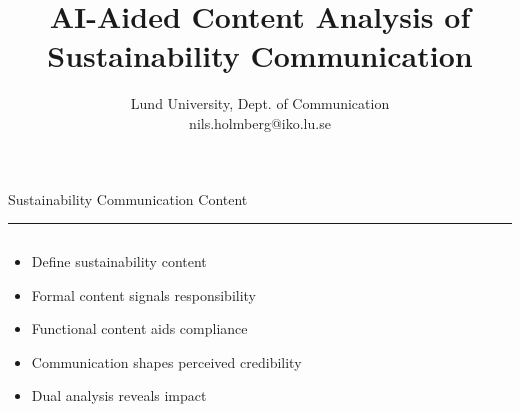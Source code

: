 \documentclass[aspectratio=169]{beamer}
\title{AI-Aided Content Analysis of Sustainability Communication}
\subtitle{Lund University, Dept. of Communication \\[0.8em]nils.holmberg@iko.lu.se}
\author{}
\newcommand{\TitleFont}{\rmfamily}
\begin{document}
\begin{frame}[plain]
  \titlepage
\end{frame}
\setcounter{framenumber}{0} %

\begin{frame}[t]{}
  \vspace*{0.5cm}
  {\TitleFont\fontsize{18}{22}\selectfont\color{LUBronze}Sustainability Communication Content\par}
  \vspace{0.3em}
  {\color{LUBronze}\rule{\linewidth}{0.8pt}}\par
  \vspace{0.2cm}
  \begin{columns}[t]
    \begin{column}[t]{0.45\textwidth}
      \vspace*{0pt}
      \begin{itemize}\setlength\itemsep{0.65em}
        \item Define sustainability content
        \item Formal content signals responsibility
        \item Functional content aids compliance
        \item Communication shapes perceived credibility
        \item Dual analysis reveals impact
      \end{itemize}
    \end{column}
  \end{columns}
\end{frame}
\end{document}
